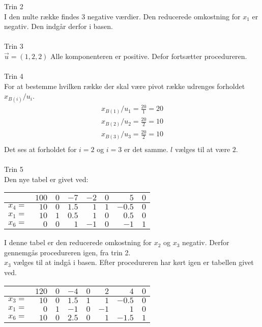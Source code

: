 \begin{eks}
Trin 2\\
I den nulte række findes 3 negative værdier. Den reducerede omkostning for $x_1$ er negativ. Den indgår derfor i basen. \\
\\
Trin 3\\
$\vec{u}=(1,2,2)$ Alle komponenteren er positive. Defor fortsætter procedureren. \\
\\
Trin 4\\
For at bestemme hvilken række der skal være pivot række udrenges forholdet $x_{B(i)}/u_i$. 
\begin{align*}
x_{B(1)}/u_1=\frac{20}{1}=20\\
x_{B(2)}/u_2=\frac{20}{2}=10\\
x_{B(3)}/u_3=\frac{20}{2}=10\\
\end{align*}
Det ses at forholdet for $i=2$ og $i=3$ er det samme. $l$ vælges til at være $2$. \\
\\
Trin 5\\
Den nye tabel er givet ved:
\begin{center}
\begin{tabular}{r| r|r r r r r r|}
  \hline	
  &$100$&$0$ &$-7$&$-2$&$0$&$5$&$0$\\ \hline	
  $x_4=$&$10$&$0$&$1.5$&$1$&$1$&$-0.5$&$0$\\	
  $x_1=$&$10$&$1$&$0.5$&$1$&$0$&$0.5$&$0$\\
  $x_6=$&$0$&$0$&$1$&$-1$&$0$&$-1$&$1$\\
   \hline
\end{tabular}
\end{center}
I denne tabel er den reducerede omkostning for $x_2$ og $x_3$ negativ. Derfor gennemgås procedureren igen, fra trin 2.\\
$x_3$ vælges til at indgå i basen. Efter procedureren har kørt igen er tabellen givet ved. 
\begin{center}
\begin{tabular}{r| r|r r r r r r|}
  \hline	
  &$120$&$0$ &$-4$&$0$&$2$&$4$&$0$\\ \hline	
  $x_3=$&$10$&$0$&$1.5$&$1$&$1$&$-0.5$&$0$\\	
  $x_1=$&$0$&$1$&$-1$&$0$&$-1$&$1$&$0$\\
  $x_6=$&$10$&$0$&$2.5$&$0$&$1$&$-1.5$&$1$\\
   \hline
\end{tabular}
\end{center}

\end{eks}
